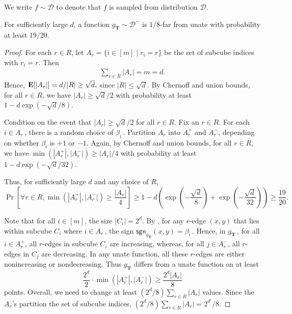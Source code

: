 \documentclass{toc}
\DeclareMathOperator{\E}{\hbox{\bf E}}
\newcommand{\bT}{\ensuremath{\mathbf{T}}}
\newcommand{\cD}{\ensuremath{\mathcal{D}}}
\newcommand{\No}{\ensuremath{\mathcal{D}^-}}
\newcommand{\sgn}{\mathsf{sgn}}
\newcommand{\Clm}[1]{\expref{Claim}{clm:#1}}
\begin{document}
We write $f \sim \cD$ to denote that $f$ is sampled from distribution $\cD$.

\begin{claim}\label{clm:no}
For sufficiently large $d$, a function $g_{\bT} \sim \No$ is $1/8$-far from unate with probability at least $19/20$.
\end{claim}

\begin{proof}
%
For each $r \in R$, let $A_r = \{ i \in [m] \mid r_i = r \}$ be the set of subcube indices with $r_i = r$.
Then
\begin{align}
\sum\limits_{r \in R} |A_r| = m = d \label{eqn:A_r}.
\end{align}
Hence, $\E[|A_r|] = d/|R| \geq \sqrt{d},$
since $|R| \leq \sqrt{d}$. By Chernoff and union bounds, for all $r \in R$,
we have $|A_r| \geq \sqrt{d}/2$	with probability at least $1 - d\exp(-\sqrt{d}/8)$.
	
Condition on the event that $|A_r| \geq \sqrt{d}/2$ for all $r \in R$.
Fix an $r \in R$.
For each $i \in A_r$\,, %
there is a random choice of $\beta_i$\,. %
Partition $A_r$ into $A^+_r$ and $A^-_r$,
depending on whether $\beta_i$ is
%
%
$+1$ or $-1$.   %
Again, by Chernoff and union bounds, for all $r \in R$, we have $\min(|A^+_r|,|A^-_r|) \geq |A_r|/4$ with probability at least $1-d\exp(-\sqrt{d}/32)$.

Thus, for sufficiently large $d$ and any choice of $R$,
\[
\Pr \left[\forall r \in R, \min(|A_r^+|, |A_r^-|) \geq \frac{|A_r|}{4} \right] \geq 1 - d\left(\exp \left(-\frac{\sqrt{d}}{8} \right) + \exp \left(-\frac{\sqrt{d}}{32} \right) \right) \geq \frac{19}{20}.
\]


%
Note that for all $i \in [m]$, the size $|C_i| = 2^d$.
By \Clm{interesting}, for any $r$-edge $(x,y)$ that lies within 
subcube $C_i$ where $i \in A_r$\,, %
the sign $\sgn_{g_{\bT}}(x,y) = \beta_i$\,. %
Hence, in $g_{\bT}$\,,  %
for all $i \in A^+_r$, all $r$-edges in subcube $C_i$ are increasing, whereas, for all $j \in A^-_r$, all $r$-edges in $C_j$ are decreasing.
In any unate function, all these $r$-edges are either nonincreasing or nondecreasing.
Thus $g_{\bT}$ differs from a unate function on at least
\[
  \frac{2^d}{2} \cdot \min(|A^+_r|,|A^-_r|) \geq \frac{2^d |A_r|}{8}
\]
points.  Overall, we need to change at least
$({2^d}/{8})\sum_{r \in R} |A_r|$ values. Since the $A_r$'s
partition the set of subcube indices,
$({2^d}/{8}) \sum_{r \in R} |A_r| = {2^{d'}}/{8}$.
\end{proof}
\end{document}
